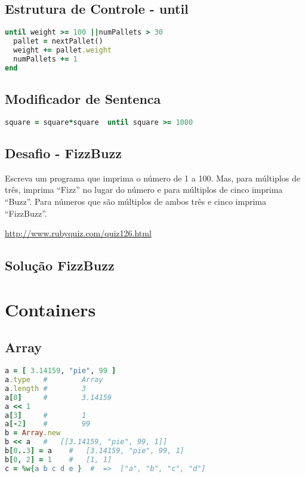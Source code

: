 \documentclass[serif,mathserif]{article}
\begin{document}
\subsection{Estrutura de Controle -  until} 
\begin{lstlisting}[language=ruby]
until weight >= 100 ||numPallets > 30
  pallet = nextPallet()
  weight += pallet.weight
  numPallets += 1
end
\end{lstlisting}

\subsection {Modificador de Sentenca}
\begin{lstlisting}[language=ruby]
square = square*square  until square >= 1000
\end{lstlisting}

\subsection{Desafio - FizzBuzz}  
Escreva um programa que imprima o número de 1 a 100.
Mas, para múltiplos de três, imprima  ``Fizz'' no lugar do
número e para múltiplos de cinco imprima ``Buzz''. Para
números que são múltiplos de ambos três e cinco
imprima ``FizzBuzz''.
 
\url{http://www.rubyquiz.com/quiz126.html}

\subsection{Solução FizzBuzz}



\section{Containers}

\subsection{Array}
\begin{lstlisting}[language=ruby]
a = [ 3.14159, "pie", 99 ]
a.type   #        Array
a.length #        3
a[0]     #        3.14159
a << 1
a[3]     #        1
a[-2]    #        99
b = Array.new
b << a   #   [[3.14159, "pie", 99, 1]]
b[0..3] = a    #   [3.14159, "pie", 99, 1]
b[0, 2] = 1    #   [1, 1]
c = %w{a b c d e }  #  =>  ["a", "b", "c", "d"]
\end{lstlisting}
\end{document}

